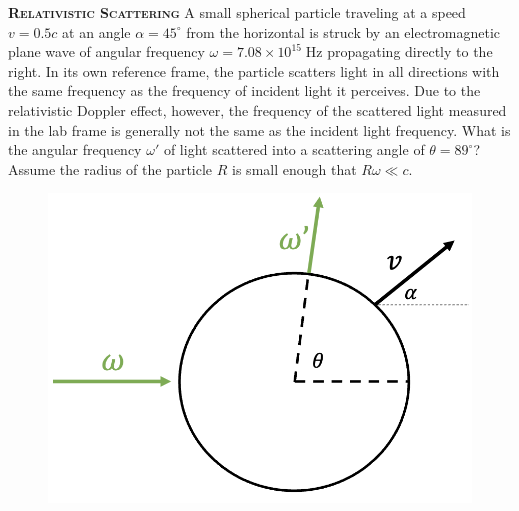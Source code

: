 

\begin{problem}

\textbf{\textsc{Relativistic Scattering}} A small spherical particle traveling at a speed $v=0.5c$ at an angle $\alpha=45^{\circ}$ from the horizontal is struck by an electromagnetic plane wave of angular frequency $\omega=7.08\times 10^{15} \;\mathrm{Hz}$ propagating directly to the right. In its own reference frame, the particle scatters light in all directions with the same frequency as the frequency of incident light it perceives. Due to the relativistic Doppler effect, however, the frequency of the scattered light measured in the lab frame is generally not the same as the incident light frequency. What is the angular frequency $\omega'$ of light scattered into a scattering angle of $\theta=89^{\circ}$? Assume the radius of the particle $R$ is small enough that $R\omega \ll c$.
\FloatBarrier
\begin{figure}[h]
    \centering
    \includegraphics[width=0.4\linewidth]{problems/figures/rel_sca_fig.png}
    \label{fig:enter-label}
\end{figure}
\FloatBarrier
\end{problem}
